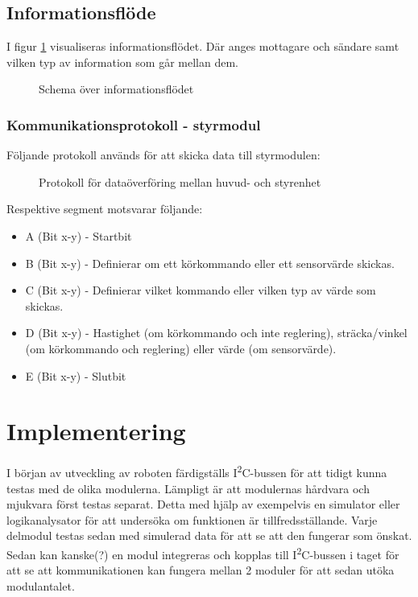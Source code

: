 \documentclass[11pt]{article}
\begin{document}
\begin{flushleft}
\subsection{Informationsflöde}
I figur \ref{informationFlow} visualiseras informationsflödet. Där anges mottagare och sändare samt vilken typ av information som går mellan dem.

\begin{figure}[htbp]
\centering
\noindent\resizebox{.8\linewidth}{!}{
	}
	\caption{Schema över informationsflödet\label{informationFlow}}	
\end{figure}

\subsubsection{Kommunikationsprotokoll - styrmodul}
Följande protokoll används för att skicka data till styrmodulen:

\begin{figure}[htbp]
\centering
\noindent\resizebox{.8\linewidth}{!}{
	}
	\caption{Protokoll för dataöverföring mellan huvud- och styrenhet\label{styrdata}}	
\end{figure}

Respektive segment motsvarar följande: 
\begin{itemize}
	\item A (Bit x-y) - Startbit
	\item B (Bit x-y) - Definierar om ett körkommando eller ett sensorvärde skickas.
	\item C (Bit x-y) - Definierar vilket kommando eller vilken typ av värde som skickas.
	\item D (Bit x-y) - Hastighet (om körkommando och inte reglering), sträcka/vinkel (om körkommando och reglering) eller värde (om sensorvärde).
	\item E (Bit x-y) - Slutbit
\end{itemize}

\pagebreak
\section{Implementering}

I början av utveckling av roboten färdigställs I\textsuperscript{2}C-bussen för att tidigt kunna testas med de olika modulerna. Lämpligt är att modulernas hårdvara och mjukvara först testas separat. Detta med hjälp av exempelvis en simulator eller logikanalysator för att undersöka om funktionen är tillfredsställande. Varje delmodul testas sedan med simulerad data för att se att den fungerar som önskat. Sedan kan kanske(?) en modul integreras och kopplas till I\textsuperscript{2}C-bussen i taget för att se att kommunikationen kan fungera mellan 2 moduler för att sedan utöka modulantalet. 


\end{flushleft}
\end{document}
